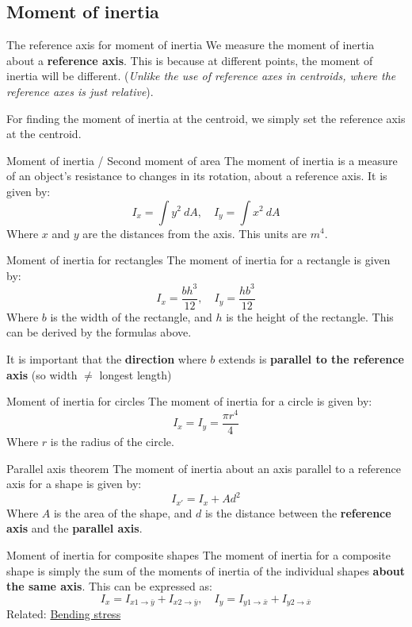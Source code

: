 \subsection{Moment of inertia}
\begin{knBox}
    {The reference axis for moment of inertia}
    We measure the moment of inertia about a \textbf{reference axis}. This is because at different points, the moment of inertia will be different. (\emph{Unlike the use of reference axes in centroids, where the reference axes is just relative}).

    For finding the moment of inertia at the centroid, we simply set the reference axis at the centroid.
\end{knBox}
\begin{definition}
    {Moment of inertia / Second moment of area}
    The moment of inertia is a measure of an object's resistance to changes in its rotation, about a reference axis. It is given by:
    \[I_x=\int y^2\:dA,\quad I_y=\int x^2\:dA\]
    Where $x$ and $y$ are the distances from the axis. This units are $m^4$.
\end{definition}
\begin{theorem}
    {Moment of inertia for rectangles}
    The moment of inertia for a rectangle is given by:
    \[I_x=\frac{bh^3}{12},\quad I_y=\frac{hb^3}{12}\]
    Where $b$ is the width of the rectangle, and $h$ is the height of the rectangle. This can be derived by the formulas above.

    It is important that the \textbf{direction} where $b$ extends is \textbf{parallel to the reference axis} (so width $\ne$ longest length)
\end{theorem}
\begin{theorem}
    {Moment of inertia for circles}
    The moment of inertia for a circle is given by:
    \[I_x=I_y=\frac{\pi r^4}{4}\]
    Where $r$ is the radius of the circle.
\end{theorem}
\begin{theorem}
    {Parallel axis theorem}
    The moment of inertia about an axis parallel to a reference axis for a shape is given by:
    \[I_{x'}=I_{x}+Ad^2\]
    Where $A$ is the area of the shape, and $d$ is the distance between the \textbf{reference axis} and the \textbf{parallel axis}.
\end{theorem}
\begin{definition}
    {Moment of inertia for composite shapes}
    The moment of inertia for a composite shape is simply the sum of the moments of inertia of the individual shapes \textbf{about the same axis}. This can be expressed as:
    \[I_x=I_{x1\to\bar{y}} + I_{x2\to\bar{y}},\quad I_y=I_{y1\to\bar{x}} + I_{y2\to\bar{x}}\]
    Related: \hyperref[sec:bendingstress]{Bending stress}
\end{definition}

